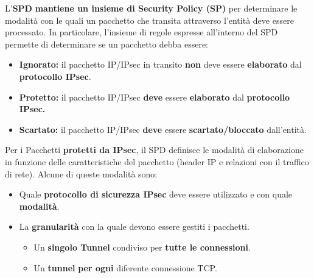 \begin{definition}\label{def:spd}
L'\textbf{SPD} \textbf{mantiene un insieme di Security Policy (SP)} per determinare le modalità con le quali un pacchetto che transita attraverso l’entità deve essere processato. In particolare, l’insieme di regole espresse all’interno del SPD permette di determinare se un pacchetto debba essere:
\begin{itemize}
    \item \textbf{Ignorato:} il pacchetto IP/IPsec in transito \textbf{non} deve essere \textbf{elaborato} dal \textbf{protocollo IPsec}.
    \item \textbf{Protetto:} il pacchetto IP/IPsec \textbf{deve} essere \textbf{elaborato} dal \textbf{protocollo IPsec.}
    \item \textbf{Scartato:} il pacchetto IP/IPsec \textbf{deve} essere \textbf{scartato/bloccato} dall’entità.
\end{itemize}
Per i Pacchetti \textbf{protetti da IPsec}, il SPD definisce le modalità di elaborazione in funzione delle caratteristiche del pacchetto (header IP e relazioni con il traffico di rete). Alcune di queste modalità sono:
\begin{itemize}
    \item Quale \textbf{protocollo di sicurezza IPsec} deve essere utilizzato e con quale \textbf{modalità}.
    \item La \textbf{granularità} con la quale devono essere gestiti i pacchetti.
    \begin{itemize}
        \item Un \textbf{singolo Tunnel} condiviso per \textbf{tutte le connessioni}.
        \item Un \textbf{tunnel} \textbf{per ogni} diferente connessione TCP.
    \end{itemize}
\end{itemize}
\end{definition}
